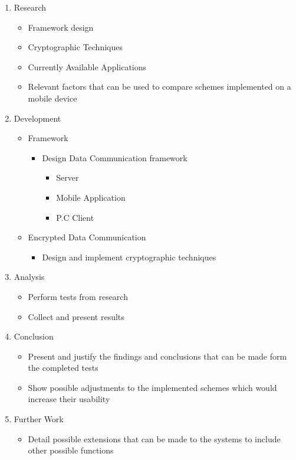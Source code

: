 \documentclass[a4paper,10pt]{report}
\begin{document}
\begin{enumerate}
  \item Research
  \begin{itemize}
    \item Framework design
    \item Cryptographic Techniques
    \item Currently Available Applications
    \item Relevant factors that can be used to compare schemes implemented on a mobile device
  \end{itemize}
  \item Development
  \begin{itemize}
    \item Framework
    \begin{itemize} 
      \item Design Data Communication framework
      \begin{itemize}
        \item Server
        \item Mobile Application
        \item P.C Client
      \end{itemize}
    \end{itemize}
  \item Encrypted Data Communication
  \begin{itemize}
    \item Design and implement cryptographic techniques
  \end{itemize}
  \end{itemize}
  \item Analysis
  \begin{itemize}
    \item Perform tests from research
    \item Collect and present results
  \end{itemize}
  \item Conclusion
  \begin{itemize}
    \item Present and justify the findings and conclusions that can be made form the completed tests
    \item Show possible adjustments to the implemented schemes which would increase their usability
  \end{itemize}
  \item Further Work
  \begin{itemize}
    \item Detail possible extensions that can be made to the systems to include other possible functions
  \end{itemize}
\end{enumerate}
\end{document}
